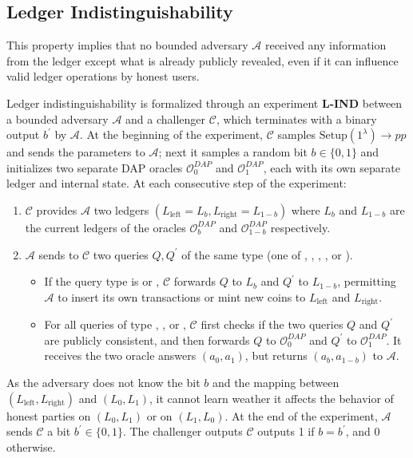 \documentclass{llncs}
\begin{document}
\subsection{Ledger Indistinguishability}

This property implies that no bounded adversary $\mathcal{A}$ received any information from the ledger except what is already publicly revealed, even if it can influence valid ledger operations by honest users.

Ledger indistinguishability is formalized through an experiment \textbf{L-IND} between a bounded adversary $\mathcal{A}$ and a challenger $\mathcal{C}$, which terminates with a binary output $b^{\prime}$ by $\mathcal{A}$.
At the beginning of the experiment, $\mathcal{C}$ samples $\text{Setup}(1^\lambda) \to pp$ and sends the parameters to $\mathcal{A}$; next it samples a random bit $b \in \lbrace 0,1 \rbrace$ and initializes two separate DAP oracles $\mathcal{O}_0^{DAP}$ and $\mathcal{O}_1^{DAP}$, each with its own separate ledger and internal state.
At each consecutive step of the experiment:
\begin{enumerate}
\item $\mathcal{C}$ provides $\mathcal{A}$ two ledgers $(L_{\text{left}} = L_b, L_{\text{right}} = L_{1-b})$ where $L_b$ and $L_{1-b}$ are the current ledgers of the oracles $\mathcal{O}_b^{DAP}$ and $\mathcal{O}_{1-b}^{DAP}$ respectively. 
\item $\mathcal{A}$ sends to $\mathcal{C}$ two queries $Q, Q^{\prime}$ of the same type (one of , , , , or ). 
\begin{itemize}
    \item If the query type is  or , $\mathcal{C}$ forwards $Q$ to $L_{b}$ and $Q^\prime$ to $L_{1-b}$, permitting $\mathcal{A}$ to insert its own transactions or mint new coins to $L_{\text{left}}$ and $L_{\text{right}}$.
    \item For all queries of type , , or , $\mathcal{C}$ first checks if the two queries $Q$ and $Q^\prime$ are publicly consistent, and then forwards $Q$ to $\mathcal{O}_0^{DAP}$ and $Q^\prime$ to $\mathcal{O}_1^{DAP}$.
    It receives the two oracle answers $(a_0,a_1)$, but returns $(a_b,a_{1-b})$ to $\mathcal{A}$.
\end{itemize}
\end{enumerate}
As the adversary does not know the bit $b$ and the mapping between $(L_{\text{left}}, L_{\text{right}})$ and $(L_0, L_1)$, it cannot learn weather it affects the behavior of honest parties on $(L_0, L_1)$ or on $(L_1, L_0)$.
At the end of the experiment, $\mathcal{A}$ sends $\mathcal{C}$ a bit $b^\prime \in \lbrace 0,1 \rbrace$.
The challenger outputs $\mathcal{C}$ outputs 1 if $b = b^\prime$, and 0 otherwise.
\end{document}
